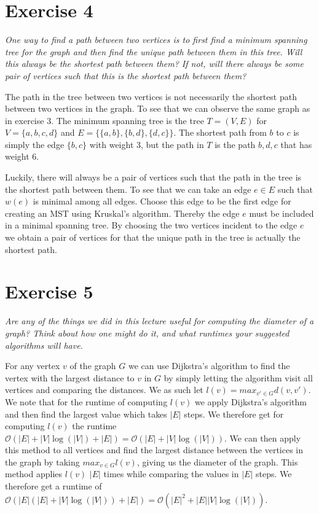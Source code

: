 \documentclass{article}
\begin{document}
\section*{Exercise 4}
\emph{One way to find a path between two vertices is to first find a minimum spanning tree for the graph and then find the unique path between them in this tree. Will this always be the shortest path between them? If not, will there always be some pair of vertices such that this is the shortest path between them?}
\vspace{0.4cm}

The path in the tree between two vertices is not necessarily the shortest path between two vertices in the graph. To see that we can observe the same graph as in exercise 3. The minimum spanning tree is the tree $T = (V,E)$ for $V = \{a,b,c,d\}$ and $E = \{\{a,b\}, \{b,d\}, \{d,c\}\}$. The shortest path from $b$ to $c$ is simply the edge $\{b,c\}$ with weight 3, but the path in $T$ is the path $b,d,c$ that has weight 6.

Luckily, there will always be a pair of vertices such that the path in the tree is the shortest path between them. To see that we can take an edge $e \in E$ such that $w(e)$ is minimal among all edges. Choose this edge to be the first edge for creating an MST using Kruskal's algorithm. Thereby the edge $e$ must be included in a minimal spanning tree. By choosing the two vertices incident to the edge $e$ we obtain a pair of vertices for that the unique path in the tree is actually the shortest path.

\section*{Exercise 5}
\emph{Are any of the things we did in this lecture useful for computing the diameter of a graph? Think about how one might do it, and what runtimes your suggested algorithms will have.}
\vspace{0.4cm}

For any vertex $v$ of the graph $G$ we can use Dijkstra’s algorithm to find the vertex with the largest distance to $v$ in $G$ by simply letting the algorithm visit all vertices and comparing the distances. We as such let $l(v) = max_{v' \in G} d(v, v')$. We note that for the runtime of computing $l(v)$ we apply Dijkstra’s algorithm and then find the largest value which takes $|E|$ steps. We therefore get for computing $l(v)$ the runtime $\mathcal{O}(|E| + |V|\log(|V|) + |E|) = \mathcal{O}(|E| + |V|\log(|V|))$. We can then apply this method to all vertices and find the largest distance between the vertices in the graph by taking $max_{v \in G} l(v)$, giving us the diameter of the graph. This method applies $l(v)$ $|E|$ times while comparing the values in $|E|$ steps. We therefore get a runtime of $\mathcal{O}(|E|(|E| + |V|\log(|V|)) + |E|) = \mathcal{O}(|E|^2 + |E||V|\log(|V|))$.
\end{document}

